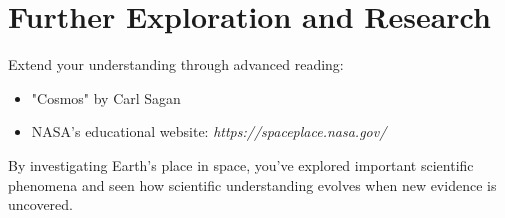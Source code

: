\section{Further Exploration and Research}
Extend your understanding through advanced reading:
\begin{itemize}
    \item "Cosmos" by Carl Sagan
    \item NASA's educational website: \textit{https://spaceplace.nasa.gov/}
\end{itemize}

By investigating Earth's place in space, you've explored important scientific phenomena and seen how scientific understanding evolves when new evidence is uncovered.